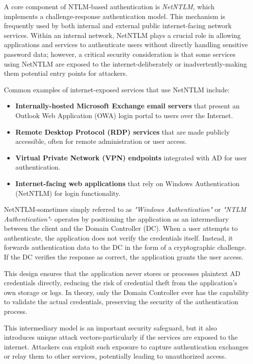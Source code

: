 A core component of NTLM-based authentication is \textit{NetNTLM,} which implements a challenge-response authentication model. This mechanism is frequently used by both internal and external public internet-facing network services. Within an internal network, NetNTLM plays a crucial role in allowing applications and services to authenticate users without directly handling sensitive password data; however, a critical security consideration is that some services using NetNTLM are exposed to the internet-deliberately or inadvertently-making them potential entry points for attackers.

Common examples of internet-exposed services that use NetNTLM include:
\begin{itemize}
    \item \textbf{Internally-hosted Microsoft Exchange email servers} that present an Outlook Web Application (OWA) login portal to users over the Internet.
    \item \textbf{Remote Desktop Protocol (RDP) services} that are made publicly accessible, often for remote administration or user access.
    \item \textbf{Virtual Private Network (VPN) endpoints} integrated with AD for user authentication.
    \item \textbf{Internet-facing web applications} that rely on Windows Authentication (NetNTLM) for login functionality.
\end{itemize}

NetNTLM-sometimes simply referred to as \textit{"Windows Authentication"} or \textit{"NTLM Authentication"}- operates by positioning the application as an intermediary between the client and the Domain Controller (DC). When a user attempts to authenticate, the application does not verify the credentials itself. Instead, it forwards authentication data to the DC in the form of a cryptographic challenge. If the DC verifies the response as correct, the application grants the user access.

This design ensures that the application never stores or processes plaintext AD credentials directly, reducing the risk of credential theft from the application's own storage or logs. In theory, only the Domain Controller ever has the capability to validate the actual credentials, preserving the security of the authentication process.

This intermediary model is an important security safeguard, but it also introduces unique attack vectors-particularly if the services are exposed to the internet. Attackers can exploit such exposure to capture authentication exchanges or relay them to other services, potentially leading to unauthorized access.

